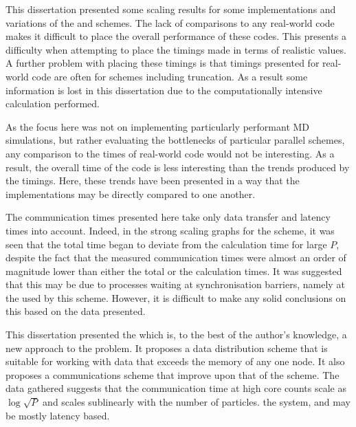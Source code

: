 This dissertation presented some scaling results for some implementations
and variations of the \replicateddata{} and \systolicloop{} schemes.
%
The lack of comparisons to any real-world code makes it difficult
to place the overall performance of these codes.
%
This presents a difficulty when attempting to place the timings
made in terms of realistic values.
%
A further problem with placing these timings is that timings presented
for real-world code are often for schemes including truncation.
%
As a result some information is lost in this dissertation due to
the computationally intensive calculation performed.

As the focus here was not on implementing particularly performant
MD simulations, but rather evaluating the bottlenecks of particular
parallel schemes, any comparison to the times of real-world code
would not be interesting.
%
As a result, the overall time of the code is less interesting than
the trends produced by the timings.
%
Here, these trends have been presented in a way that the
implementations may be directly compared to one another.

The communication times presented here take only data transfer and
latency times into account.
%
Indeed, in the strong scaling graphs for the \replicatedsystolicloop{}
scheme, it was seen that the total time began to deviate from the
calculation time for large $P$, despite the fact that the measured
communication times were almost an order of magnitude lower than
either the total or the calculation times.
%
It was suggested that this may be due to processes waiting at
synchronisation barriers, namely at the \mpiallreduce{} used
by this scheme.
%
However, it is difficult to make any solid conclusions on this based
on the data presented.

This dissertation presented the \replicatedsystolicloop{} which is,
to the best of the author's knowledge, a new approach to the problem.
%
It proposes a data distribution scheme that is suitable for working
with data that exceeds the memory of any one node.
%
It also proposes a communications scheme that improve upon that
of the \replicateddata{} scheme.
%
The data gathered suggests that the communication time at high core
counts scale as $\log{\sqrt{P}}$ and scales sublinearly with the
number of particles.
the system, and may be mostly latency based.
